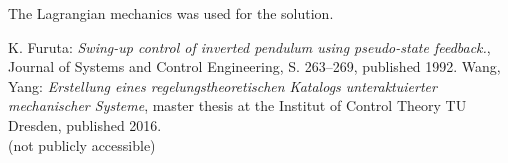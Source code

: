 \documentclass[10pt,a4paper]{article}
\begin{document}
	The Lagrangian mechanics was used for the solution.
	
	
	\begin{thebibliography}{10}	
		K. Furuta: 
		\textit{Swing-up control of inverted pendulum using pseudo-state feedback.}, Journal of Systems and Control Engineering, S. 263–269, published 1992.
		Wang, Yang:  
		\textit{Erstellung eines regelungstheoretischen Katalogs unteraktuierter mechanischer Systeme}, master thesis at the Institut of Control Theory TU Dresden, published 2016. \\
		(not publicly accessible)
	\end{thebibliography}
\end{document}
